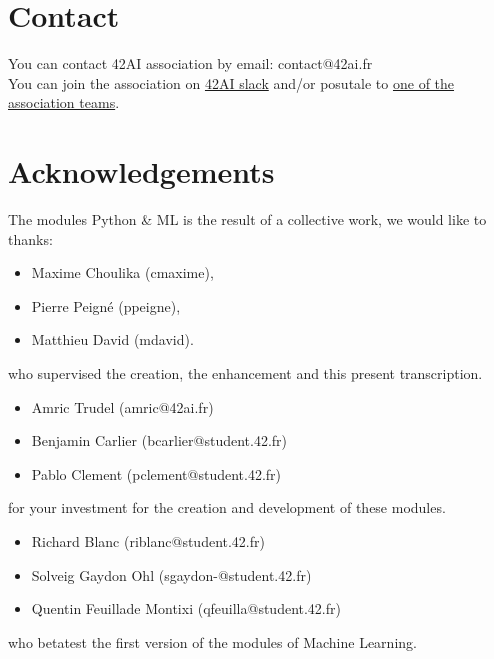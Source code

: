 \documentclass{42-en}
\begin{document}
\newpage

\section*{Contact}
You can contact 42AI association by email: contact@42ai.fr\\
You can join the association on \href{https://join.slack.com/t/42-ai/shared_invite/zt-ebccw5r7-YPkDM6xOiYRPjqJXkrKgcA}{42AI slack}
and/or posutale to \href{https://forms.gle/VAFuREWaLmaqZw2D8}{one of the association teams}.

\section*{Acknowledgements}
The modules Python \& ML is the result of a collective work, we would like to thanks:
\begin{itemize}
  \item Maxime Choulika (cmaxime),
  \item Pierre Peigné (ppeigne),
  \item Matthieu David (mdavid).
\end{itemize}
who supervised the creation, the enhancement and this present transcription.

\begin{itemize}
  \item Amric Trudel (amric@42ai.fr)
  \item Benjamin Carlier (bcarlier@student.42.fr)
  \item Pablo Clement (pclement@student.42.fr)
\end{itemize}
for your investment for the creation and development of these modules.

\begin{itemize}
  \item Richard Blanc (riblanc@student.42.fr)
  \item Solveig Gaydon Ohl (sgaydon-@student.42.fr)
  \item Quentin Feuillade Montixi (qfeuilla@student.42.fr)
\end{itemize}
who betatest the first version of the modules of Machine Learning.
\vfill
\doclicenseThis
\end{document}
